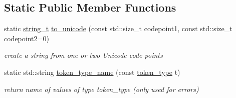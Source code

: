 \subsection*{Static Public Member Functions}
\begin{DoxyCompactItemize}
\item 
static \hyperlink{classnlohmann_1_1basic__json_ab63e618bbb0371042b1bec17f5891f42}{string\+\_\+t} \hyperlink{classnlohmann_1_1basic__json_1_1lexer_aaba589becdcea269f271466f73dbf08b}{to\+\_\+unicode} (const std\+::size\+\_\+t codepoint1, const std\+::size\+\_\+t codepoint2=0)
\begin{DoxyCompactList}\small\item\em create a string from one or two Unicode code points \end{DoxyCompactList}\item 
\hypertarget{classnlohmann_1_1basic__json_1_1lexer_ae6c3b669531bc34b7dbd7abe9aa4530d}{}\label{classnlohmann_1_1basic__json_1_1lexer_ae6c3b669531bc34b7dbd7abe9aa4530d} 
static std\+::string \hyperlink{classnlohmann_1_1basic__json_1_1lexer_ae6c3b669531bc34b7dbd7abe9aa4530d}{token\+\_\+type\+\_\+name} (const \hyperlink{classnlohmann_1_1basic__json_1_1lexer_a96887d6cd131e3d3a85a9d71fbdbcdf7}{token\+\_\+type} t)
\begin{DoxyCompactList}\small\item\em return name of values of type token\+\_\+type (only used for errors) \end{DoxyCompactList}\end{DoxyCompactItemize}
